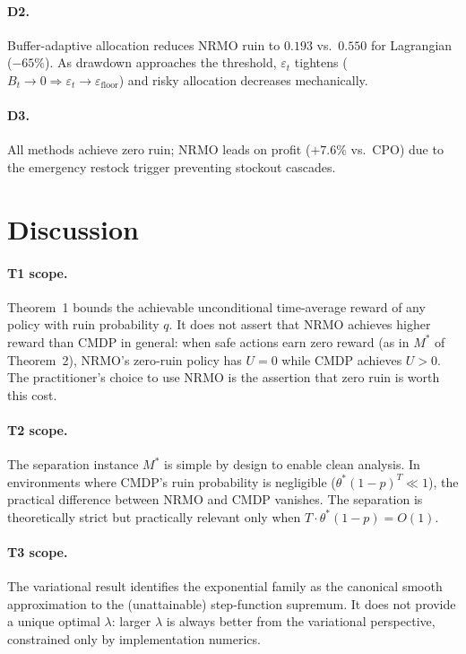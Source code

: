 \paragraph{D2.}
Buffer-adaptive allocation reduces NRMO ruin to $0.193$ vs.~$0.550$
for Lagrangian ($-65\%$). As drawdown approaches the threshold,
$\varepsilon_t$ tightens ($B_t \to 0 \Rightarrow \varepsilon_t \to
\varepsilon_{\mathrm{floor}}$) and risky allocation decreases
mechanically.

\paragraph{D3.}
All methods achieve zero ruin; NRMO leads on profit ($+7.6\%$
vs.~CPO) due to the emergency restock trigger preventing stockout
cascades.

\section{Discussion}
\label{sec:arxiv-discussion}

\paragraph{T1 scope.}
Theorem~1 bounds the achievable unconditional time-average reward of
any policy with ruin probability $q$. It does not assert that NRMO
achieves higher reward than CMDP in general: when safe actions earn
zero reward (as in $M^*$ of Theorem~2), NRMO's zero-ruin policy has
$U = 0$ while CMDP achieves $U > 0$. The practitioner's choice to
use NRMO is the assertion that zero ruin is worth this cost.

\paragraph{T2 scope.}
The separation instance $M^*$ is simple by design to enable clean
analysis. In environments where CMDP's ruin probability is
negligible ($\theta^*(1 - p)^T \ll 1$), the practical difference
between NRMO and CMDP vanishes. The separation is theoretically
strict but practically relevant only when $T \cdot \theta^*(1 - p)
= O(1)$.

\paragraph{T3 scope.}
The variational result identifies the exponential family as the
canonical smooth approximation to the (unattainable) step-function
supremum. It does not provide a unique optimal $\lambda$: larger
$\lambda$ is always better from the variational perspective,
constrained only by implementation numerics.

